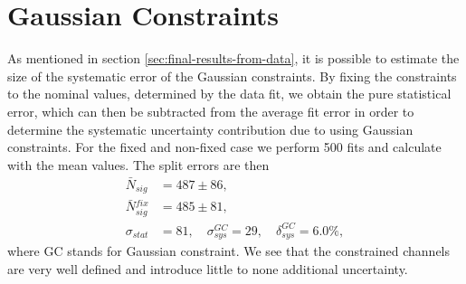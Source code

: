 \section{Gaussian Constraints}
As mentioned in section \ref{sec:final-results-from-data}, it is possible to estimate the size of the systematic error of the Gaussian constraints. By fixing the constraints to the nominal values, determined by the data fit, we obtain the pure statistical error, which can then be subtracted from the average fit error in order to determine the systematic uncertainty contribution due to using Gaussian constraints. For the fixed and non-fixed case we perform 500 fits and calculate with the mean values. The split errors are then
\begin{align}
\bar N {}_{sig} &= 487 \pm 86, \\
\bar N {}_{sig}^{fix} &= 485 \pm 81, \\
\sigma_{stat} &= 81,\quad \sigma_{sys}^{GC} = 29,\quad \delta_{sys}^{GC} = 6.0\%,
\end{align}
where GC stands for Gaussian constraint. We see that the constrained channels are very well defined and introduce little to none additional uncertainty.



